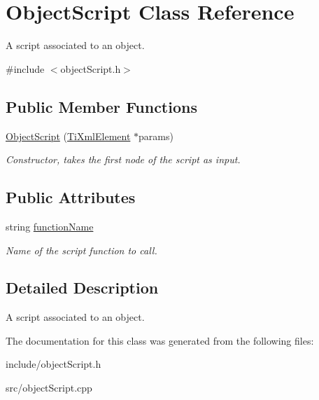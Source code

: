 \hypertarget{classObjectScript}{
\section{\-Object\-Script \-Class \-Reference}
\label{d5/d85/classObjectScript}
}


\-A script associated to an object.  




{\ttfamily \#include $<$object\-Script.\-h$>$}

\subsection*{\-Public \-Member \-Functions}
\begin{DoxyCompactItemize}
\item 
\hypertarget{classObjectScript_a8c54e262fc4c058eeef54d2ee66e3c49}{
\hyperlink{classObjectScript_a8c54e262fc4c058eeef54d2ee66e3c49}{\-Object\-Script} (\hyperlink{classTiXmlElement}{\-Ti\-Xml\-Element} $\ast$params)}
\label{d5/d85/classObjectScript_a8c54e262fc4c058eeef54d2ee66e3c49}

\begin{DoxyCompactList}\small\item\em \-Constructor, takes the first node of the script as input. \end{DoxyCompactList}\end{DoxyCompactItemize}
\subsection*{\-Public \-Attributes}
\begin{DoxyCompactItemize}
\item 
\hypertarget{classObjectScript_a27054f5b93f7a5633a0450ee68dd1d54}{
string \hyperlink{classObjectScript_a27054f5b93f7a5633a0450ee68dd1d54}{function\-Name}}
\label{d5/d85/classObjectScript_a27054f5b93f7a5633a0450ee68dd1d54}

\begin{DoxyCompactList}\small\item\em \-Name of the script function to call. \end{DoxyCompactList}\end{DoxyCompactItemize}


\subsection{\-Detailed \-Description}
\-A script associated to an object. 

\-The documentation for this class was generated from the following files\-:\begin{DoxyCompactItemize}
\item 
include/object\-Script.\-h\item 
src/object\-Script.\-cpp\end{DoxyCompactItemize}

